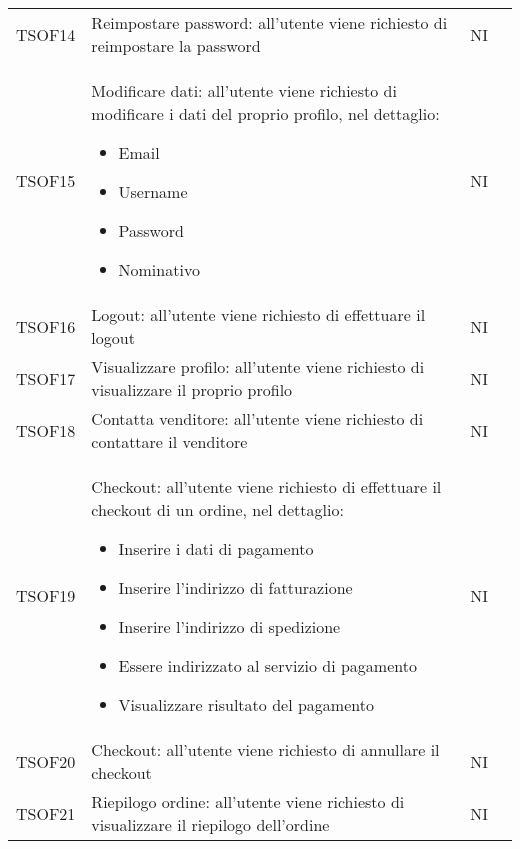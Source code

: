 \begin{center}
\begin{longtable}[!h]{p{50px} p{245px} p{75px} p{50px}}
        TSOF14                           & Reimpostare password: all'utente viene richiesto di reimpostare la password                                                                      & NI             \\
        TSOF15                           & Modificare dati: all'utente viene richiesto di modificare i dati del proprio profilo, nel dettaglio: \begin{itemize} \item Email \item Username \item Password \item Nominativo \end{itemize}                  & NI             \\
        TSOF16                           & Logout: all'utente viene richiesto di effettuare il logout                                                                                       & NI             \\
        TSOF17                           & Visualizzare profilo: all'utente viene richiesto di visualizzare il proprio profilo                                                              & NI             \\
        TSOF18                           & Contatta venditore: all'utente viene richiesto di contattare il venditore                                                                        & NI             \\
        TSOF19                           & Checkout: all'utente viene richiesto di effettuare il checkout di un ordine, nel dettaglio: \begin{itemize} \item Inserire i dati di pagamento \item Inserire l'indirizzo di fatturazione \item Inserire l'indirizzo di spedizione \item Essere indirizzato al servizio di pagamento \item Visualizzare risultato del pagamento \end{itemize}                           & NI             \\
        TSOF20                           & Checkout: all'utente viene richiesto di annullare il checkout                                                                                    & NI             \\
        TSOF21                           & Riepilogo ordine: all'utente viene richiesto di visualizzare il riepilogo dell'ordine                                                            & NI             \\

\end{longtable}
\end{center}
